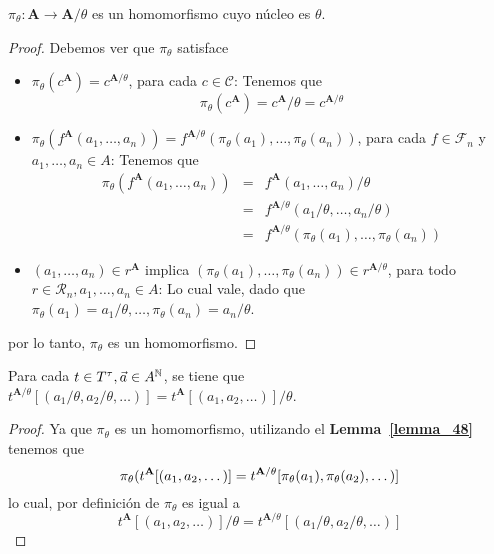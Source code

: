   \begin{lemma} \label{lemma_53}
    \PN $\pi_{\theta}: \mathbf{A} \rightarrow \mathbf{A}/\theta$ es un homomorfismo cuyo núcleo es $\theta$.
  \end{lemma}
  \begin{proof}
    \PN Debemos ver que $\pi_{\theta}$ satisface
    \begin{itemize}
      \item $\pi_{\theta}(c^{\mathbf{A}}) = c^{\mathbf{A}/\theta}$, para cada $c \in \mathcal{C}$: Tenemos que
        \[
          \pi_{\theta}(c^{\mathbf{A}}) = c^{\mathbf{A}}/\theta = c^{\mathbf{A}/\theta}
        \]
      \item $\pi_{\theta}(f^{\mathbf{A}}(a_{1}, \dotsc, a_{n})) = f^{\mathbf{A}/\theta}(\pi_{\theta}(a_{1}), \dotsc,
        \pi_{\theta}(a_{n}))$, para cada $f \in \mathcal{F}_{n}$ y $a_{1}, \dotsc, a_{n} \in A$: \linebreak Tenemos que
        \begin{eqnarray*}
          \pi_{\theta}(f^{\mathbf{A}}(a_{1}, \dotsc, a_{n})) &=& f^{\mathbf{A}}(a_{1}, \dotsc, a_{n})/\theta \\
          &=& f^{\mathbf{A}/\theta}(a_{1}/\theta, \dotsc, a_{n}/\theta) \\
          &=& f^{\mathbf{A}/\theta}(\pi_{\theta}(a_{1}), \dotsc, \pi_{\theta}(a_{n}))
        \end{eqnarray*}

      \item $(a_{1}, \dotsc, a_{n}) \in r^{\mathbf{A}}$ implica $(\pi_{\theta}(a_{1}), \dotsc, \pi_{\theta}(a_{n})) \in
        r^{\mathbf{A}/\theta}$, para todo $r \in \mathcal{R}_{n}, a_{1}, \dotsc, a_{n} \in A$: Lo cual vale, dado que
        $\pi_{\theta}(a_{1}) = a_{1}/\theta, \dotsc, \pi_{\theta}(a_{n}) = a_{n}/\theta$.
    \end{itemize}
    \PN por lo tanto, $\pi_{\theta}$ es un homomorfismo.
  \end{proof}

  \begin{corollary} \label{corollary_54}
    \PN Para cada $t \in T^{\tau}, \vec{a} \in A^{\mathbb{N}}$, se tiene que $t^{\mathbf{A}/\theta}[(a_{1}/\theta,
    a_{2}/\theta, \dotsc)] = t^{\mathbf{A}}[(a_{1}, a_{2}, \dotsc)]/\theta$.
  \end{corollary}
  \begin{proof}
    \PN Ya que $\pi_{\theta}$ es un homomorfismo, utilizando el \textbf{Lemma~\ref{lemma_48}} tenemos que
    \[
      \pi_{\theta}(t^{\mathbf{A}}[(a_{1}, a_{2}, \dotsc)] = t^{\mathbf{A}/\theta}[\pi_{\theta}(a_{1}),
        \pi_{\theta}(a_{2}), \dotsc)] \\
    \]
    \PN lo cual, por definición de $\pi_{\theta}$ es igual a
    \[
      t^{\mathbf{A}}[(a_{1}, a_{2}, \dotsc)]/\theta = t^{\mathbf{A}/\theta}[(a_{1}/\theta, a_{2}/\theta, \dotsc)]
    \]
  \end{proof}

